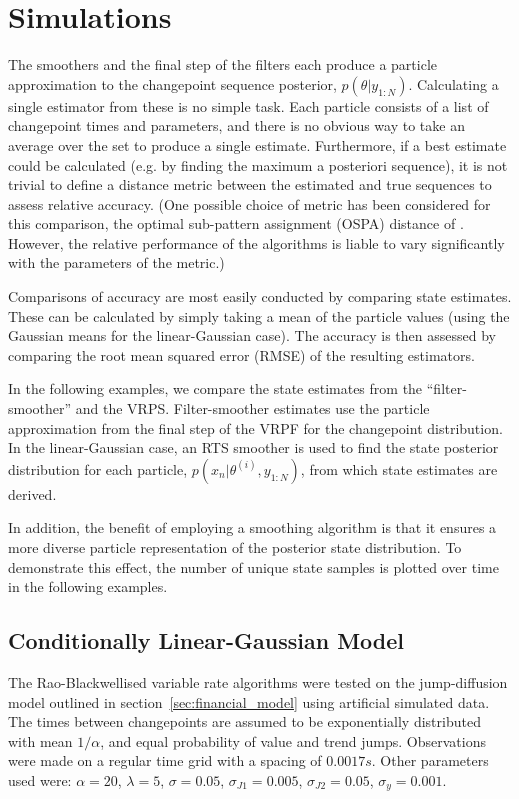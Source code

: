 \documentclass[peerreview,11pt,draftcls,onecolumn]{IEEEtran}
\begin{document}
\section{Simulations} \label{sec:simulations}

The smoothers and the final step of the filters each produce a particle approximation to the changepoint sequence posterior, $p(\theta|y_{1:N})$. Calculating a single estimator from these is no simple task. Each particle consists of a list of changepoint times and parameters, and there is no obvious way to take an average over the set to produce a single estimate. Furthermore, if a best estimate could be calculated (e.g. by finding the maximum a posteriori sequence), it is not trivial to define a distance metric between the estimated and true sequences to assess relative accuracy. (One possible choice of metric has been considered for this comparison, the optimal sub-pattern assignment (OSPA) distance of \cite{Schuhmacher2008}. However, the relative performance of the algorithms is liable to vary significantly with the parameters of the metric.)

Comparisons of accuracy are most easily conducted by comparing state estimates. These can be calculated by simply taking a mean of the particle values (using the Gaussian means for the linear-Gaussian case). The accuracy is then assessed by comparing the root mean squared error (RMSE) of the resulting estimators.

In the following examples, we compare the state estimates from the ``filter-smoother'' \cite{Kitagawa1996} and the VRPS. Filter-smoother estimates use the particle approximation from the final step of the VRPF for the changepoint distribution. In the linear-Gaussian case, an RTS smoother is used to find the state posterior distribution for each particle, $p(x_n|\theta^{(i)}, y_{1:N})$, from which state estimates are derived.

In addition, the benefit of employing a smoothing algorithm is that it ensures a more diverse particle representation of the posterior state distribution. To demonstrate this effect, the number of unique state samples is plotted over time in the following examples.



\subsection{Conditionally Linear-Gaussian Model} \label{sec:finance}

The Rao-Blackwellised variable rate algorithms were tested on the jump-diffusion model outlined in section~\ref{sec:financial_model} using artificial simulated data. The times between changepoints are assumed to be exponentially distributed with mean $1/\alpha$, and equal probability of value and trend jumps. Observations were made on a regular time grid with a spacing of $0.0017s$. Other parameters used were: $\alpha = 20$, $\lambda = 5$, $\sigma = 0.05$, $\sigma_{J1} = 0.005$, $\sigma_{J2} = 0.05$, $\sigma_{y} = 0.001$.
\end{document}
